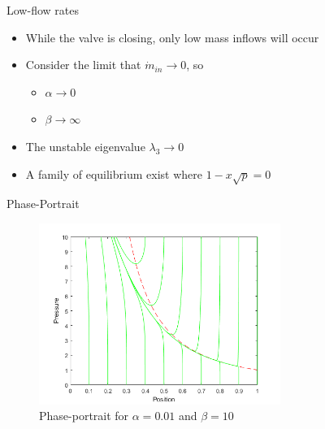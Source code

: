 \documentclass[svgnames,fragile]{beamer}
\begin{document}
\begin{frame}{Low-flow rates}
\begin{itemize}
    \item<1-> While the valve is closing, only low mass inflows will occur
    \item<2-> Consider the limit that $\dot{m}_{in} \rightarrow 0$, so
    \begin{itemize}
        \item<3-> $\alpha \rightarrow 0$
        \item<4-> $\beta \rightarrow \infty$
    \end{itemize}
    \item<5-> The unstable eigenvalue $\lambda_3 \rightarrow 0$
    \item<6-> A family of equilibrium exist where $1 - x \sqrt{p} = 0$
\end{itemize}
\end{frame}

\begin{frame}{Phase-Portrait}
\begin{figure}
    \centering
    \includegraphics[width=0.7\textwidth]{Figures/LowFlow/LargePhasePortrait-b=10.png}
    \caption{Phase-portrait for $\alpha = 0.01$ and $\beta = 10$}
\end{figure}
\end{frame}
\end{document}
